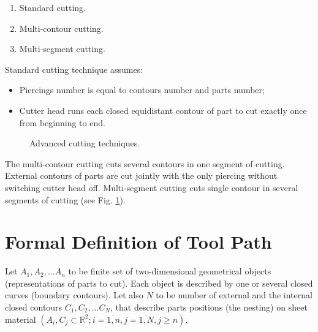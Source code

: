 \documentclass{../download/tPRS2e}
\begin{document}
\begin{enumerate}
\item Standard cutting. 
\item Multi-contour cutting.
\item Multi-segment cutting.
\end{enumerate}

Standard cutting technique assumes:

\begin{itemize}
\item Piercings number is equal to contours number and parts number;
\item Cutter head runs each closed equidistant contour of part to cut exactly once from beginning to end. 
\end{itemize}

\begin{figure}
\begin{center}
\caption{Advanced cutting techniques.} \label{technics}
\end{center}
\end{figure}

The multi-contour cutting cuts several contours in one segment of cutting.
External contours of parts are cut jointly with the only piercing without switching cutter head off.
Multi-segment cutting cuts single contour in several segments of cutting (see Fig. \ref{technics}).

\section{Formal Definition of Tool Path}

Let $A_1, A_2, \dots A_n$ to be finite set of two-dimensional geometrical objects
(representations of parts to cut).
Each object is described by one or several closed curves (boundary contours). 
Let also $N$ to be number of external and the internal closed contours $C_1, C_2, \dots C_N$,
that describe parts positions (the nesting) on sheet material
$(A_i, C_j \subset \mathbb{R}^2; i = \overline{1,n}, j = \overline{1, N}, j \ge n )$.
\end{document}
